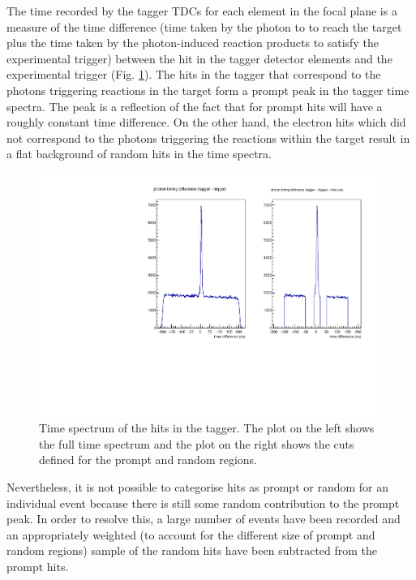 \indent The time recorded by the tagger TDCs for each element in the focal plane is a measure of the time difference (time taken by the photon to to reach the target plus the time taken by the photon-induced reaction products to satisfy the experimental trigger) between the hit in the tagger detector elements and the experimental trigger (Fig. \ref{taggertime}). The hits in the tagger that correspond to the photons triggering reactions in the target form a prompt peak in the tagger time spectra. The peak is a reflection of the fact that for prompt hits will have a roughly constant time difference. On the other hand, the electron hits which did not correspond to the photons triggering the reactions within the target result in a flat background of random hits in the time spectra.

\begin{figure}[H]
\begin{center}
\includegraphics[scale=0.7]{pictures/pdf/taggertime.pdf}
\caption{Time spectrum of the hits in the tagger. The plot on the left shows the full time spectrum and the plot on the right shows the cuts defined for the prompt and random regions.}
\label{taggertime}
\end{center}
\end{figure}

\indent Nevertheless, it is not possible to categorise hits as prompt or random for an individual event because there is still some random contribution to the prompt peak. In order to resolve this, a large number of events have been recorded and an appropriately weighted (to account for the different size of prompt and random regions) sample of the random hits have been subtracted from the prompt hits.

